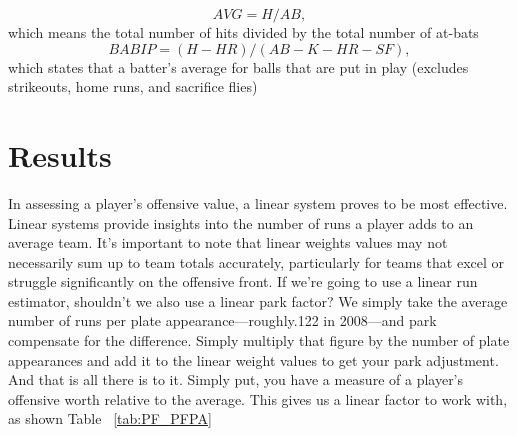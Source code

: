 \documentclass[12pt]{article}
\begin{document}
\begin{equation}
  \label{eq:AVG}
  AVG = H/AB,
\end{equation}
which means the total number of hits divided by the total number of at-bats
\begin{equation}
  \label{eq:BABIP}
  BABIP = (H - HR) / (AB - K - HR - SF),
\end{equation}
which states that a batter's average for balls that are put in play (excludes strikeouts, home runs, and 
sacrifice flies)




\section{Results}
\label{sec:resu}
In assessing a player's offensive value, a linear system proves to be most effective. Linear systems
provide insights into the number of runs a player adds to an average team. It's important 
to note that linear weights values may not necessarily sum up to team totals accurately, 
particularly for teams that excel or struggle significantly on the offensive front. If we're going to use a 
linear run estimator, shouldn't we also use a linear park factor? We simply 
take the average number of runs per plate appearance—roughly.122 in 2008—and park compensate for the 
difference. Simply multiply that figure by the number of plate appearances and add it to the 
linear weight values to get your park adjustment. And that is all there is to it. Simply put, 
you have a measure of a player's offensive worth relative to the average.
This gives us a linear factor to work with, as shown Table~ \ref*{tab:PF_PFPA}
\end{document}
